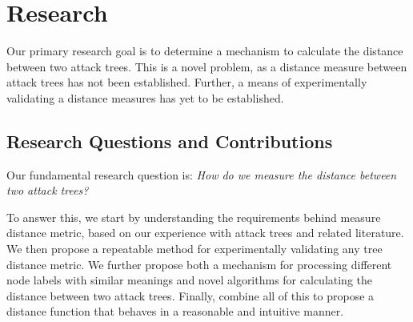 
\section{Research}

Our primary research goal is to determine a mechanism to calculate the distance between two attack trees. This is a novel problem, as a distance measure between attack trees has not been established. Further, a means of experimentally validating a distance measures has yet to be established.


\subsection{Research Questions and Contributions}


Our fundamental research question is: \emph{How do we measure the distance between two attack trees?}

To answer this, we start by understanding the requirements behind measure distance metric, based on our experience with attack trees and related literature. We then propose a repeatable method for experimentally validating any tree distance metric. We further propose both a mechanism for processing different node labels with similar meanings and novel algorithms for calculating the distance between two attack trees. Finally, combine all of this to propose a distance function that behaves in a reasonable and intuitive manner.




